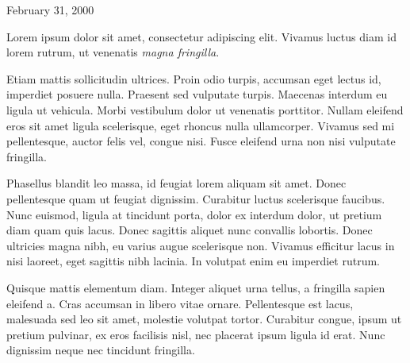 \documentclass{coverletter}
\begin{document}
\begin{letterheader}
\end{letterheader}

\begin{letter}{February 31, 2000}
\subject{Application for Lorem Ipsum Specialist}
\begin{content}

Lorem ipsum dolor sit amet, consectetur adipiscing elit. Vivamus luctus diam id lorem rutrum, ut venenatis \textit{magna fringilla}.

Etiam mattis sollicitudin ultrices. Proin odio turpis, accumsan eget lectus id, imperdiet posuere nulla. Praesent sed vulputate turpis. Maecenas interdum eu ligula ut vehicula. Morbi vestibulum dolor ut venenatis porttitor. Nullam eleifend eros sit amet ligula scelerisque, eget rhoncus nulla ullamcorper. Vivamus sed mi pellentesque, auctor felis vel, congue nisi. Fusce eleifend urna non nisi vulputate fringilla.

Phasellus blandit leo massa, id feugiat lorem aliquam sit amet. Donec pellentesque quam ut feugiat dignissim. Curabitur luctus scelerisque faucibus. Nunc euismod, ligula at tincidunt porta, dolor ex interdum dolor, ut pretium diam quam quis lacus. Donec sagittis aliquet nunc convallis lobortis. Donec ultricies magna nibh, eu varius augue scelerisque non. Vivamus efficitur lacus in nisi laoreet, eget sagittis nibh lacinia. In volutpat enim eu imperdiet rutrum.

Quisque mattis elementum diam. Integer aliquet urna tellus, a fringilla sapien eleifend a. Cras accumsan in libero vitae ornare. Pellentesque est lacus, malesuada sed leo sit amet, molestie volutpat tortor. Curabitur congue, ipsum ut pretium pulvinar, ex eros facilisis nisl, nec placerat ipsum ligula id erat. Nunc dignissim neque nec tincidunt fringilla.

\end{content}
\end{letter}


\begin{contactdetails}
\end{contactdetails}
\end{document}
